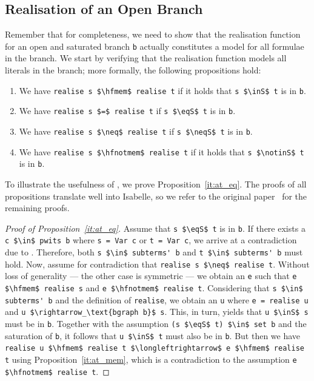 \documentclass[runningheads]{llncs}
\newcommand{\inS}{\in_\text{s}}
\newcommand{\notinS}{\notin_\text{s}}
\newcommand{\eqS}{=_\text{s}}
\newcommand{\neqS}{\neq_\text{s}}
\newcommand{\hfmem}{\boldsymbol{\in}}
\newcommand{\hfnotmem}{\boldsymbol{\notin}}
\begin{document}
\subsection{Realisation of an Open Branch\label{sec:real}}
Remember that for completeness, we need to show that the realisation function for an open and saturated branch \lstinline!b! actually constitutes a model for all formulae in the branch.
We start by verifying that the realisation function models all literals in the branch; more formally, the following propositions hold:
\begin{enumerate}[label={(\arabic*)}]
  \item\label{it:at_mem} We have \lstinline!realise s $\hfmem$ realise t! if it holds that \lstinline!s $\inS$ t! is in \lstinline!b!. 
  \item\label{it:at_eq} We have \lstinline!realise s $=$ realise t! if \lstinline!s $\eqS$ t! is in \lstinline!b!.
  \item\label{it:af_eq} We have \lstinline!realise s $\neq$ realise t! if \lstinline!s $\neqS$ t! is in \lstinline!b!.
  \item\label{it:af_mem} We have \lstinline!realise s $\hfnotmem$ realise t! if it holds that \lstinline!s $\notinS$ t! is in \lstinline!b!. 
\end{enumerate}
To illustrate the usefulness of , we prove Proposition~\ref{it:at_eq}.
The proofs of all propositions translate well into Isabelle, so we refer to the original paper~\cite{new_fast_tableau} for the remaining proofs. 
\begin{proof}[Proof of Proposition~\ref{it:at_eq}]
  Assume that \lstinline!s $\eqS$ t! is in \lstinline!b!.
  If there exists a \lstinline!c $\in$ pwits b! where \lstinline!s = Var c! or \lstinline!t = Var c!, we arrive at a contradiction due to .
  Therefore, both \lstinline!s $\in$ subterms' b! and \lstinline!t $\in$ subterms' b! must hold.
  Now, assume for contradiction that \lstinline!realise s $\neq$ realise t!.
  Without loss of generality --- the other case is symmetric --- we obtain an \lstinline!e! such that
  \lstinline!e $\hfmem$ realise s! and \lstinline!e $\hfnotmem$ realise t!. 
  Considering that \lstinline!s $\in$ subterms' b! and the definition of \lstinline!realise!, we obtain an \lstinline!u! where \lstinline!e = realise u! and \lstinline!u $\rightarrow_\text{bgraph b}$ s!.
  This, in turn, yields that \lstinline!u $\inS$ s! must be in \lstinline!b!.
  Together with the assumption \lstinline!(s $\eqS$ t) $\in$ set b! and the saturation of \lstinline!b!, it follows that \lstinline!u $\inS$ t! must also be in \lstinline!b!.
  But then we have
  \lstinline!realise u $\hfmem$ realise t $\longleftrightarrow$ e $\hfmem$ realise t!
  using Proposition~\ref{it:at_mem}, which is a contradiction to the assumption \lstinline!e $\hfnotmem$ realise t!.
\end{proof}
\end{document}
